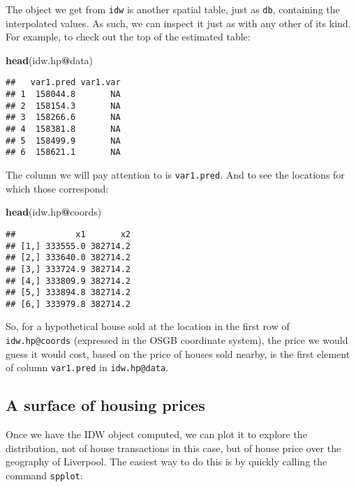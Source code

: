 \documentclass[]{book}
\newenvironment{Shaded}{\begin{snugshade}}{\end{snugshade}}
\newcommand{\KeywordTok}[1]{\textcolor[rgb]{0.13,0.29,0.53}{\textbf{#1}}}
\newcommand{\NormalTok}[1]{#1}
\newcommand{\OperatorTok}[1]{\textcolor[rgb]{0.81,0.36,0.00}{\textbf{#1}}}
\begin{document}
The object we get from \texttt{idw} is another spatial table, just as \texttt{db}, containing the interpolated values. As such, we can inspect it just as with any other of its kind. For example, to check out the top of the estimated table:

\begin{Shaded}
\begin{Highlighting}[]
\KeywordTok{head}\NormalTok{(idw.hp}\OperatorTok{@}\NormalTok{data)}
\end{Highlighting}
\end{Shaded}

\begin{verbatim}
##   var1.pred var1.var
## 1  158044.8       NA
## 2  158154.3       NA
## 3  158266.6       NA
## 4  158381.8       NA
## 5  158499.9       NA
## 6  158621.1       NA
\end{verbatim}

The column we will pay attention to is \texttt{var1.pred}. And to see the locations for which those correspond:

\begin{Shaded}
\begin{Highlighting}[]
\KeywordTok{head}\NormalTok{(idw.hp}\OperatorTok{@}\NormalTok{coords)}
\end{Highlighting}
\end{Shaded}

\begin{verbatim}
##            x1       x2
## [1,] 333555.0 382714.2
## [2,] 333640.0 382714.2
## [3,] 333724.9 382714.2
## [4,] 333809.9 382714.2
## [5,] 333894.8 382714.2
## [6,] 333979.8 382714.2
\end{verbatim}

So, for a hypothetical house sold at the location in the first row of \texttt{idw.hp@coords} (expressed in the OSGB coordinate system), the price we would guess it would cost, based on the price of houses sold nearby, is the first element of column \texttt{var1.pred} in \texttt{idw.hp@data}.

\hypertarget{a-surface-of-housing-prices}{%
\subsection{A surface of housing prices}\label{a-surface-of-housing-prices}}

Once we have the IDW object computed, we can plot it to explore the distribution, not of house transactions in this case, but of house price over the geography of Liverpool. The easiest way to do this is by quickly calling the command \texttt{spplot}:
\end{document}
